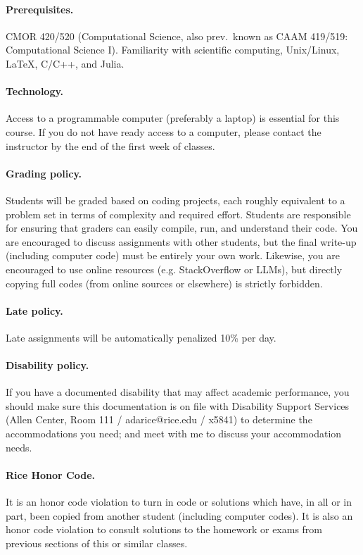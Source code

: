 \documentclass[10pt]{article}
\begin{document}
\paragraph{Prerequisites.} CMOR 420/520 (Computational Science, also prev.\ known as CAAM 419/519: Computational Science I). Familiarity with scientific computing, Unix/Linux, \LaTeX, C/C++, and Julia.

\paragraph{Technology.} Access to a programmable computer (preferably a laptop) is essential for this course. If you do not have ready access to a computer, please contact the instructor by the end of the first week of classes. 

\paragraph{Grading policy.} Students will be graded based on coding projects, each roughly equivalent to a problem set in terms of complexity and required effort. Students are responsible for ensuring that graders can easily compile, run, and understand their code. You are encouraged to discuss assignments with other students, but the final write-up (including computer code) must be entirely your own work. Likewise, you are encouraged to use online resources (e.g. StackOverflow or LLMs), but directly copying full codes (from online sources or elsewhere) is strictly forbidden. 

\paragraph{Late policy.} Late assignments will be automatically penalized 10\% per day. 

\paragraph{Disability policy.} If you have a documented disability that may affect academic performance, you should make sure this documentation is on file with Disability Support Services (Allen Center, Room 111 / adarice@rice.edu / x5841) to determine the accommodations you need; and meet with me to discuss your accommodation needs.

\paragraph{Rice Honor Code.} It is an honor code violation to turn in code or solutions which have, in all or in part, been copied from another student (including computer codes). It is also an honor code violation to consult solutions to the homework or exams from previous sections of this or similar classes. 
\end{document}
